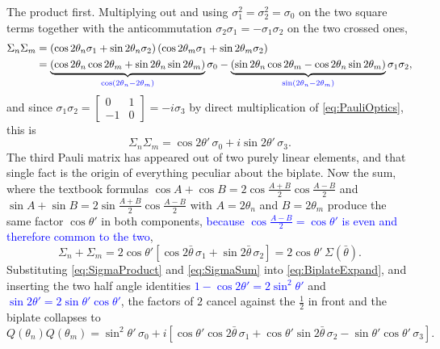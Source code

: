            The product first. Multiplying out and using $\sigma_1^2=\sigma_2^2=\sigma_0$ on the two square terms together with the anticommutation $\sigma_2\sigma_1=-\sigma_1\sigma_2$ on the two crossed ones,
            \begin{align*}
                \Sigma_n\Sigma_m &= \left(\cos2\theta_n\sigma_1+\sin2\theta_n\sigma_2\right)\left(\cos2\theta_m\sigma_1+\sin2\theta_m\sigma_2\right) \\
                &= \underbrace{\left(\cos2\theta_n\cos2\theta_m+\sin2\theta_n\sin2\theta_m\right)}_{\textcolor{blue}{\cos\left(2\theta_n-2\theta_m\right)}}\sigma_0 - \underbrace{\left(\sin2\theta_n\cos2\theta_m-\cos2\theta_n\sin2\theta_m\right)}_{\textcolor{blue}{\sin\left(2\theta_n-2\theta_m\right)}}\sigma_1\sigma_2 ,
            \end{align*}
            and since $\sigma_1\sigma_2=\left[\begin{smallmatrix}0&1\\-1&0\end{smallmatrix}\right]=-i\sigma_3$ by direct multiplication of \ref{eq:PauliOptics}, this is
            \begin{equation}\label{eq:SigmaProduct}
                \Sigma_n\Sigma_m = \cos2\theta'\,\sigma_0 + i\sin2\theta'\,\sigma_3 .
            \end{equation}
            The third Pauli matrix has appeared out of two purely linear elements, and that single fact is the origin of everything peculiar about the biplate. Now the sum, where the textbook formulas $\cos A+\cos B=2\cos\frac{A+B}{2}\cos\frac{A-B}{2}$ and $\sin A+\sin B=2\sin\frac{A+B}{2}\cos\frac{A-B}{2}$ with $A=2\theta_n$ and $B=2\theta_m$ produce the same factor $\cos\theta'$ in both components, \textcolor{blue}{because $\cos\frac{A-B}{2}=\cos\theta'$ is even and therefore common to the two},
            \begin{equation}\label{eq:SigmaSum}
                \Sigma_n+\Sigma_m = 2\cos\theta'\left[\cos2\bar{\theta}\,\sigma_1+\sin2\bar{\theta}\,\sigma_2\right] = 2\cos\theta'\,\Sigma\!\left(\bar{\theta}\right).
            \end{equation}
            Substituting \ref{eq:SigmaProduct} and \ref{eq:SigmaSum} into \ref{eq:BiplateExpand}, and inserting the two half angle identities \textcolor{blue}{$1-\cos2\theta'=2\sin^2\theta'$} and \textcolor{blue}{$\sin2\theta'=2\sin\theta'\cos\theta'$}, the factors of $2$ cancel against the $\frac12$ in front and the biplate collapses to
            \begin{equation}\label{eq:BiplateOperator}
                Q(\theta_n)Q(\theta_m) = \sin^2\theta'\,\sigma_0 + i\left[\cos\theta'\cos2\bar{\theta}\,\sigma_1+\cos\theta'\sin2\bar{\theta}\,\sigma_2-\sin\theta'\cos\theta'\,\sigma_3\right].
            \end{equation}

